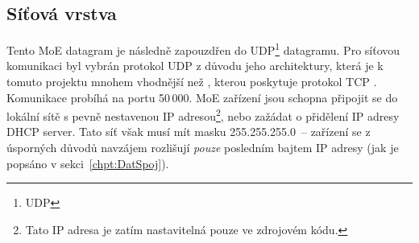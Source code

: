 \subsection{Síťová vrstva}\label{chpt:NetworkLayer}
Tento \acs{MoE} datagram je následně zapouzdřen do \acs{UDP}\footnote{\acl{UDP}} datagramu. Pro síťovou komunikaci byl vybrán protokol \acs{UDP} z důvodu jeho  architektury, která je k tomuto projektu mnohem vhodnější než , kterou poskytuje protokol TCP \cite{UDPpaper}. Komunikace probíhá na portu 50\,000.
\acs{MoE} zařízení jsou schopna připojit se do lokální sítě s pevně nestavenou IP adresou\footnote{Tato IP adresa je zatím nastavitelná pouze ve zdrojovém kódu.}, nebo zažádat o přidělení IP adresy DHCP server. Tato síť však musí mít masku 255.255.255.0~-- zařízení se z úsporných důvodů navzájem rozlišují \emph{pouze} posledním bajtem IP adresy (jak je popsáno v sekci~\ref{chpt:DatSpoj}).




